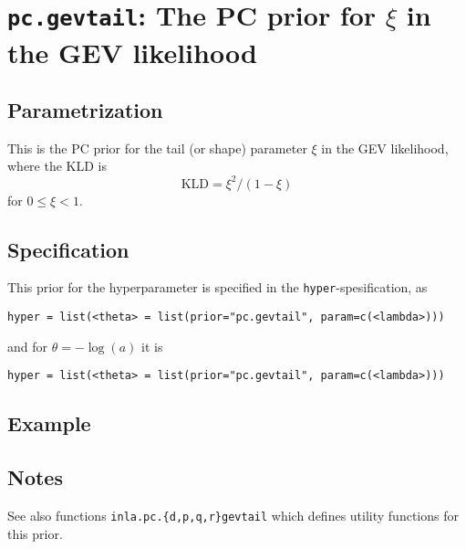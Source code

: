 \documentclass[a4paper,11pt]{article}
\begin{document}
\section*{\texttt{pc.gevtail}: The PC prior for $\xi$ in the GEV likelihood}

\subsection*{Parametrization}

This is the PC prior for the tail (or shape) parameter $\xi$ in the
GEV likelihood, where the KLD is
\begin{displaymath}
    \text{KLD} = \xi^{2}/(1-\xi)
\end{displaymath}
for $0 \le \xi < 1$.

\subsection*{Specification}
This prior for the hyperparameter is specified in the
\texttt{hyper}-spesification, as
\begin{center}
    \texttt{hyper = list(<theta> = list(prior="pc.gevtail", param=c(<lambda>)))}
\end{center}
and for $\theta = -\log(a)$ it is
\begin{center}
    \texttt{hyper = list(<theta> = list(prior="pc.gevtail", param=c(<lambda>)))}
\end{center}

\subsection*{Example}

\subsection*{Notes}

See also functions \texttt{inla.pc.\{d,p,q,r\}gevtail} which defines
utility functions for this prior.
\end{document}
